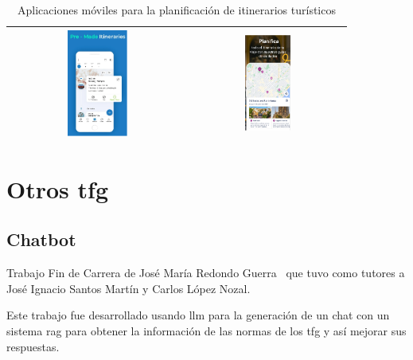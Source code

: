 \begin{table}[h!]
\begin{tabular}{cc}
	\includegraphics[width=0.35\textwidth]{img/visit_a_city.png} & \includegraphics[width=0.31\textwidth]{img/tiquets.png} \\
	\hline
	\end{tabular}
	\caption{Aplicaciones móviles para la planificación de itinerarios turísticos}
	\label{fig:apps_similares}
	\end{table}
	
\section{Otros \acrfull{tfg} }
	\subsection{Chatbot}
	Trabajo Fin de Carrera de José María Redondo Guerra~\cite{chatbot_github} que tuvo como tutores a José Ignacio Santos Martín y Carlos López Nozal.
	
	Este trabajo fue desarrollado usando \acrfull{llm} para la generación de un chat con un sistema \acrshort{rag} para obtener la información de las normas de los \acrshort{tfg} y así mejorar sus respuestas.
	
